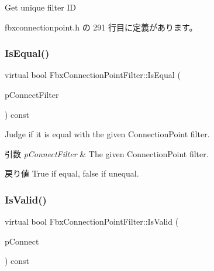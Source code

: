 Get unique filter ID 



 fbxconnectionpoint.\+h の 291 行目に定義があります。

\mbox{\label{class_fbx_connection_point_filter_a20ccb6e7d73551ecec421860e6e775e0}} 
\subsubsection{\texorpdfstring{Is\+Equal()}{IsEqual()}}
{\footnotesize\ttfamily virtual bool Fbx\+Connection\+Point\+Filter\+::\+Is\+Equal (\begin{DoxyParamCaption}\item[{\hyperlink{class_fbx_connection_point_filter}{Fbx\+Connection\+Point\+Filter} $\ast$}]{p\+Connect\+Filter }\end{DoxyParamCaption}) const\hspace{0.3cm}{\ttfamily [virtual]}}

Judge if it is equal with the given Connection\+Point filter. 
\begin{DoxyParams}{引数}
{\em p\+Connect\+Filter} & The given Connection\+Point filter. \\
\hline
\end{DoxyParams}
\begin{DoxyReturn}{戻り値}
{\ttfamily True} if equal, {\ttfamily false} if unequal. 
\end{DoxyReturn}
\mbox{\label{class_fbx_connection_point_filter_abed99893efb038558371fd8a70c815b4}} 
\subsubsection{\texorpdfstring{Is\+Valid()}{IsValid()}}
{\footnotesize\ttfamily virtual bool Fbx\+Connection\+Point\+Filter\+::\+Is\+Valid (\begin{DoxyParamCaption}\item[{\hyperlink{class_fbx_connection_point}{Fbx\+Connection\+Point} $\ast$}]{p\+Connect }\end{DoxyParamCaption}) const\hspace{0.3cm}{\ttfamily [virtual]}}

